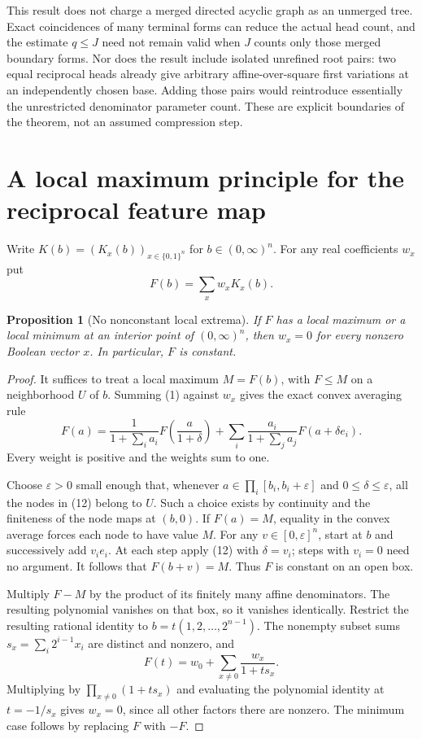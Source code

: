 \documentclass[11pt]{article}
\newtheorem{proposition}[theorem]{Proposition}
\begin{document}
This result does not charge a merged directed acyclic graph as an
unmerged tree. Exact coincidences of many terminal forms can reduce
the actual head count, and the estimate $q\le J$ need not remain
valid when $J$ counts only those merged boundary forms. Nor does the
result include isolated unrefined root pairs: two equal reciprocal
heads already give arbitrary affine-over-square first variations at
an independently chosen base. Adding those pairs would reintroduce
essentially the unrestricted denominator parameter count. These are
explicit boundaries of the theorem, not an assumed compression step.

\section{A local maximum principle for the reciprocal feature map}

Write $K(b)=(K_x(b))_{x\in\{0,1\}^n}$ for $b\in(0,\infty)^n$.
For any real coefficients $w_x$ put
\[
                     F(b)=\sum_x w_x K_x(b).
\]

\begin{proposition}[No nonconstant local extrema]
If $F$ has a local maximum or a local minimum at an interior point
of $(0,\infty)^n$, then $w_x=0$ for every nonzero Boolean vector
$x$. In particular, $F$ is constant.
\end{proposition}
\begin{proof}
It suffices to treat a local maximum $M=F(b)$, with $F\le M$
on a neighborhood $U$ of $b$. Summing (1) against $w_x$ gives
the exact convex averaging rule
\[
 F(a)=\frac1{1+\sum_i a_i}F\left(\frac a{1+\delta}\right)
       +\sum_i\frac{a_i}{1+\sum_j a_j}F(a+\delta e_i).
 \tag{22}
\]
Every weight is positive and the weights sum to one.

Choose $\varepsilon>0$ small enough that, whenever
$a\in\prod_i[b_i,b_i+\varepsilon]$ and $0\le\delta\le\varepsilon$,
all the nodes in (12) belong to $U$. Such a choice exists by
continuity and the finiteness of the node maps at $(b,0)$.
If $F(a)=M$, equality in the convex average forces each node to
have value $M$. For any $v\in[0,\varepsilon]^n$, start at $b$
and successively add $v_i e_i$. At each step apply (12) with
$\delta=v_i$; steps with $v_i=0$ need no argument. It follows
that $F(b+v)=M$. Thus $F$ is constant on an open box.

Multiply $F-M$ by the product of its finitely many affine
denominators. The resulting polynomial vanishes on that box,
so it vanishes identically. Restrict the resulting rational identity
to $b=t(1,2,\ldots,2^{n-1})$. The nonempty subset sums
$s_x=\sum_i2^{i-1}x_i$ are distinct and nonzero, and
\[
                  F(t)=w_0+\sum_{x\ne0}\frac{w_x}{1+t s_x}.
\]
Multiplying by $\prod_{x\ne0}(1+t s_x)$ and evaluating the
polynomial identity at $t=-1/s_x$ gives $w_x=0$, since all other
factors there are nonzero. The minimum case follows by replacing
$F$ with $-F$.
\end{proof}
\end{document}
